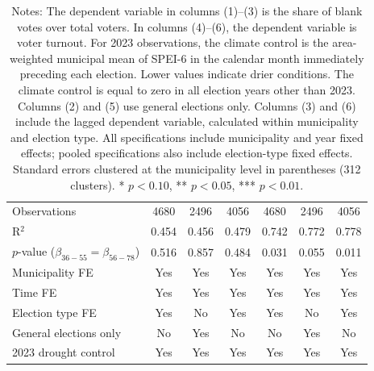 \begin{table}[!h]
\begin{tabular}[t]{lcccccc}
\addlinespace
Observations & 4680 & 2496 & 4056 & 4680 & 2496 & 4056\\
R$^2$ & 0.454 & 0.456 & 0.479 & 0.742 & 0.772 & 0.778\\
$p$-value ($\beta_{36{-}55} = \beta_{56{-}78}$) & 0.516 & 0.857 & 0.484 & 0.031 & 0.055 & 0.011\\
Municipality FE & Yes & Yes & Yes & Yes & Yes & Yes\\
Time FE & Yes & Yes & Yes & Yes & Yes & Yes\\
Election type FE & Yes & No & Yes & Yes & No & Yes\\
General elections only & No & Yes & No & No & Yes & No\\
2023 drought control & Yes & Yes & Yes & Yes & Yes & Yes\\
\hline
\end{tabular}
\vspace{0.3em}
\captionsetup{justification=justified, singlelinecheck=false}
\caption*{\footnotesize Notes: The dependent variable in columns (1)--(3) is the share of blank votes over total voters. In columns (4)--(6), the dependent variable is voter turnout. For 2023 observations, the climate control is the area-weighted municipal mean of SPEI-6 in the calendar month immediately preceding each election. Lower values indicate drier conditions. The climate control is equal to zero in all election years other than 2023. Columns (2) and (5) use general elections only. Columns (3) and (6) include the lagged dependent variable, calculated within municipality and election type. All specifications include municipality and year fixed effects; pooled specifications also include election-type fixed effects. Standard errors clustered at the municipality level in parentheses (312 clusters). * $p<0.10$, ** $p<0.05$, *** $p<0.01$.}
\end{table}
